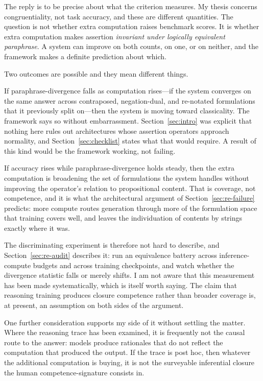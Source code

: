 The reply is to be precise about what the criterion measures. My thesis concerns
congruentiality, not task accuracy, and these are different quantities. The
question is not whether extra computation raises benchmark scores. It is whether
extra computation makes assertion \emph{invariant under logically equivalent
paraphrase}. A system can improve on both counts, on one, or on neither, and the
framework makes a definite prediction about which.

Two outcomes are possible and they mean different things.

If paraphrase-divergence falls as computation rises---if the system converges on
the same answer across contraposed, negation-dual, and re-notated formulations
that it previously split on---then the system is moving toward classicality. The
framework says so without embarrassment. Section~\ref{sec:intro} was explicit
that nothing here rules out architectures whose assertion operators approach
normality, and Section~\ref{sec:checklist} states what that would require. A
result of this kind would be the framework working, not failing.

If accuracy rises while paraphrase-divergence holds steady, then the extra
computation is broadening the set of formulations the system handles without
improving the operator's relation to propositional content. That is coverage, not
competence, and it is what the architectural argument of
Section~\ref{sec:re-failure} predicts: more compute routes generation through more
of the formulation space that training covers well, and leaves the individuation
of contents by strings exactly where it was.

The discriminating experiment is therefore not hard to describe, and
Section~\ref{sec:re-audit} describes it: run an equivalence battery across
inference-compute budgets and across training checkpoints, and watch whether the
divergence statistic falls or merely shifts. I am not aware that this measurement
has been made systematically, which is itself worth saying. The claim that
reasoning training produces closure competence rather than broader coverage is,
at present, an assumption on both sides of the argument.

One further consideration supports my side of it without settling the matter.
Where the reasoning trace has been examined, it is frequently not the causal route
to the answer: models produce rationales that do not reflect the computation that
produced the output. If the trace is post hoc, then whatever the additional
computation is buying, it is not the surveyable inferential closure the human
competence-signature consists in.

